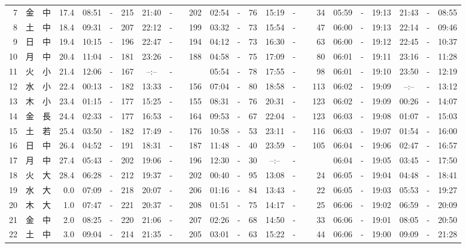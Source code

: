 \documentclass[12pt,a4j]{jsarticle}
\begin{document}
\begin{table}[htbp]
\begin{center}
{\begin{tabular}{|rc|cr|ccrccr|ccrccr|ccc|ccc|}
 7 & 金 & 中 & 17.4 &  08:51 &-& 215 &  21:40 &-& 202 &  02:54 &-&  76 &  15:19 &-&  34 & 05:59 & -& 19:13 & 21:43 & -& 08:55 \\
 8 & 土 & 中 & 18.4 &  09:31 &-& 207 &  22:12 &-& 199 &  03:32 &-&  73 &  15:54 &-&  47 & 06:00 & -& 19:13 & 22:14 & -& 09:46 \\
 9 & 日 & 中 & 19.4 &  10:15 &-& 196 &  22:47 &-& 194 &  04:12 &-&  73 &  16:30 &-&  63 & 06:00 & -& 19:12 & 22:45 & -& 10:37 \\
10 & 月 & 中 & 20.4 &  11:04 &-& 181 &  23:26 &-& 188 &  04:58 &-&  75 &  17:09 &-&  80 & 06:01 & -& 19:11 & 23:16 & -& 11:28 \\
11 & 火 & 小 & 21.4 &  12:06 &-& 167 &  --:-- &-&~~~~~ &  05:54 &-&  78 &  17:55 &-&  98 & 06:01 & -& 19:10 & 23:50 & -& 12:19 \\
12 & 水 & 小 & 22.4 &  00:13 &-& 182 &  13:33 &-& 156 &  07:04 &-&  80 &  18:58 &-& 113 & 06:02 & -& 19:09 & --:-- & -& 13:12 \\
13 & 木 & 小 & 23.4 &  01:15 &-& 177 &  15:25 &-& 155 &  08:31 &-&  76 &  20:31 &-& 123 & 06:02 & -& 19:09 & 00:26 & -& 14:07 \\
14 & 金 & 長 & 24.4 &  02:33 &-& 177 &  16:53 &-& 164 &  09:53 &-&  67 &  22:04 &-& 123 & 06:03 & -& 19:08 & 01:07 & -& 15:03 \\
15 & 土 & 若 & 25.4 &  03:50 &-& 182 &  17:49 &-& 176 &  10:58 &-&  53 &  23:11 &-& 116 & 06:03 & -& 19:07 & 01:54 & -& 16:00 \\
16 & 日 & 中 & 26.4 &  04:52 &-& 191 &  18:31 &-& 187 &  11:48 &-&  40 &  23:59 &-& 105 & 06:04 & -& 19:06 & 02:47 & -& 16:57 \\
17 & 月 & 中 & 27.4 &  05:43 &-& 202 &  19:06 &-& 196 &  12:30 &-&  30 &  --:-- &-&~~~~~ & 06:04 & -& 19:05 & 03:45 & -& 17:50 \\
18 & 火 & 大 & 28.4 &  06:28 &-& 212 &  19:37 &-& 202 &  00:40 &-&  95 &  13:08 &-&  24 & 06:05 & -& 19:04 & 04:48 & -& 18:41 \\
19 & 水 & 大 &  0.0 &  07:09 &-& 218 &  20:07 &-& 206 &  01:16 &-&  84 &  13:43 &-&  22 & 06:05 & -& 19:03 & 05:53 & -& 19:27 \\
20 & 木 & 大 &  1.0 &  07:47 &-& 221 &  20:37 &-& 208 &  01:51 &-&  75 &  14:17 &-&  25 & 06:06 & -& 19:02 & 06:59 & -& 20:09 \\
21 & 金 & 中 &  2.0 &  08:25 &-& 220 &  21:06 &-& 207 &  02:26 &-&  68 &  14:50 &-&  33 & 06:06 & -& 19:01 & 08:05 & -& 20:50 \\
22 & 土 & 中 &  3.0 &  09:04 &-& 214 &  21:35 &-& 205 &  03:01 &-&  63 &  15:22 &-&  44 & 06:06 & -& 19:00 & 09:09 & -& 21:28 \\

\end{tabular}}
\end{center}
\end{table}
\end{document}
